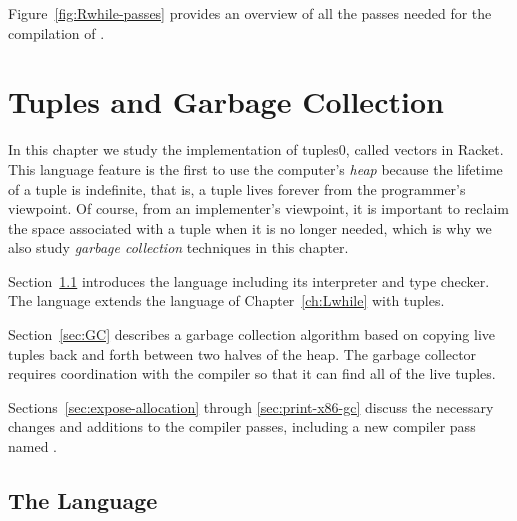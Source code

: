 \documentclass[7x10,nocrop]{TimesAPriori_MIT}%
\def\racketEd{0}
\def\edition{0}
\newcommand{\racket}[1]{{\if\edition\racketEd{#1}\fi}}
\begin{document}
Figure~\ref{fig:Rwhile-passes} provides an overview of all the passes needed
for the compilation of \LangLoop{}.






\chapter{Tuples and Garbage Collection}
\label{ch:Lvec}


In this chapter we study the implementation of
tuples\racket{, called vectors in Racket}.
%
This language feature is the first to use the computer's
\emph{heap} because the lifetime of a tuple is
indefinite, that is, a tuple lives forever from the programmer's
viewpoint. Of course, from an implementer's viewpoint, it is important
to reclaim the space associated with a tuple when it is no longer
needed, which is why we also study \emph{garbage collection}
 techniques in this chapter.

Section~\ref{sec:r3} introduces the \LangVec{} language including its
interpreter and type checker. The \LangVec{} language extends the \LangLoop{}
language of Chapter~\ref{ch:Lwhile} with tuples.

Section~\ref{sec:GC} describes a garbage collection algorithm based on
copying live tuples back and forth between two halves of the heap. The
garbage collector requires coordination with the compiler so that it
can find all of the live tuples.

Sections~\ref{sec:expose-allocation} through \ref{sec:print-x86-gc}
discuss the necessary changes and additions to the compiler passes,
including a new compiler pass named .

\section{The \LangVec{} Language}
\label{sec:r3}
\end{document}
